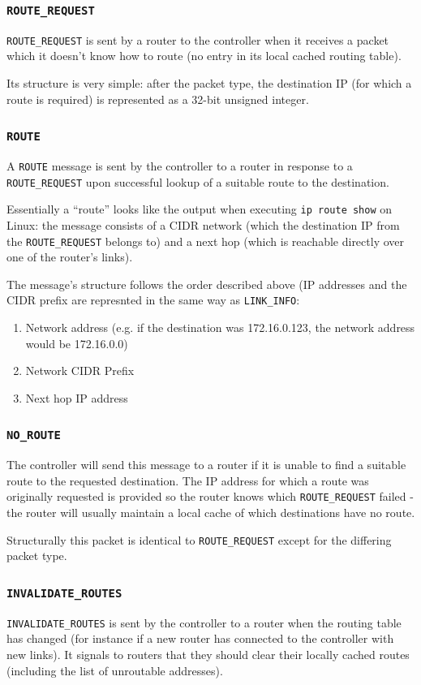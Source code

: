 \documentclass[a4paper]{article}
\numberwithin{figure}{section}
\numberwithin{table}{section}
\newcommand{\mi}{\mintinline}
\begin{document}
\subsubsection{\mi{c}{ROUTE_REQUEST}}
\mi{c}{ROUTE_REQUEST} is sent by a router to the controller when it receives a packet which it doesn't know how to route (no entry in its local cached routing table).

Its structure is very simple: after the packet type, the destination IP (for which a route is required) is represented as a 32-bit unsigned integer.

\subsubsection{\mi{c}{ROUTE}}
A \mi{c}{ROUTE} message is sent by the controller to a router in response to a \mi{c}{ROUTE_REQUEST} upon successful lookup of a suitable route to the destination.

Essentially a ``route'' looks like the output when executing \mi{c}{ip route show} on Linux: the message consists of a CIDR network (which the destination IP from the \mi{c}{ROUTE_REQUEST} belongs to) and a next hop (which is reachable directly over one of the router's links).

The message's structure follows the order described above (IP addresses and the CIDR prefix are represnted in the same way as \mi{c}{LINK_INFO}:
\begin{enumerate}
	\item Network address (e.g. if the destination was 172.16.0.123, the network address would be 172.16.0.0)
	\item Network CIDR Prefix
	\item Next hop IP address
\end{enumerate}

\subsubsection{\mi{c}{NO_ROUTE}}
The controller will send this message to a router if it is unable to find a suitable route to the requested destination. The IP address for which a route was originally requested is provided so the router knows which \mi{c}{ROUTE_REQUEST} failed - the router will usually maintain a local cache of which destinations have no route.

Structurally this packet is identical to \mi{c}{ROUTE_REQUEST} except for the differing packet type.

\subsubsection{\mi{c}{INVALIDATE_ROUTES}}
\mi{c}{INVALIDATE_ROUTES} is sent by the controller to a router when the routing table has changed (for instance if a new router has connected to the controller with new links). It signals to routers that they should clear their locally cached routes (including the list of unroutable addresses).
\end{document}
